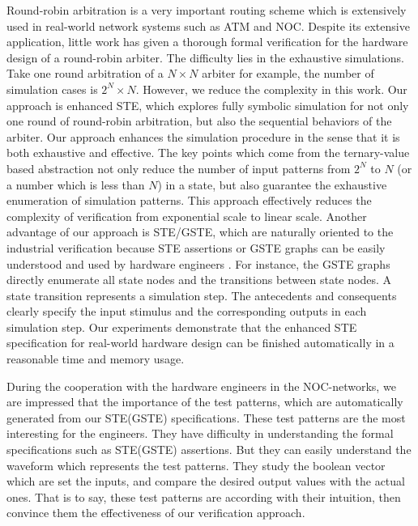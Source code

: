 \documentclass[final]{IEEEtran}
\begin{document}
Round-robin arbitration is a very important routing scheme which
is extensively used in real-world network systems such as ATM and
NOC. Despite its extensive application, little work has given a
thorough formal verification for the hardware design of a
round-robin arbiter. The difficulty lies in the   exhaustive
simulations. Take one round arbitration of a $ N\times N$ arbiter
for example, the number of simulation cases is $2^N\times N$.
However, we reduce the complexity in this work. Our
approach is enhanced STE, which explores fully symbolic simulation
for not only one round of round-robin arbitration, but also the
sequential behaviors of the arbiter. Our approach enhances the
simulation procedure in the sense that it is both
exhaustive and effective. The key points which come from the ternary-value
based abstraction not only reduce the number of input
patterns from $2^N$ to $N$ (or a number which is less than $N$) in a
state, but also guarantee the exhaustive enumeration of simulation
patterns. This approach effectively reduces the complexity of
verification from exponential scale to linear scale. Another
advantage of our approach is STE/GSTE, which are   naturally
oriented to the industrial verification because STE assertions or
GSTE graphs can be easily understood and used by hardware engineers
\cite{DBLP:conf/atva/Yang06}. For instance, the GSTE graphs directly
enumerate all state nodes and the transitions between state nodes. A
state transition represents a simulation step. The antecedents and
consequents clearly specify the input stimulus and the corresponding
outputs in each simulation step.  Our experiments demonstrate that
the enhanced STE specification for real-world hardware design can be
finished automatically in a reasonable time and memory usage.

During the cooperation with the hardware engineers in the
NOC-networks, we are impressed that the importance of the test
patterns, which are automatically generated from our STE(GSTE)
specifications.  These test patterns are the most interesting for
the engineers. They have difficulty in understanding the formal
specifications such as STE(GSTE) assertions. But they can easily
understand the waveform which represents the test patterns. They
study the boolean vector which are set the inputs, and compare the
desired output values with the actual ones. That is to say, these
test patterns are according with their intuition, then convince them
  the effectiveness of our verification approach.




\end{document}
